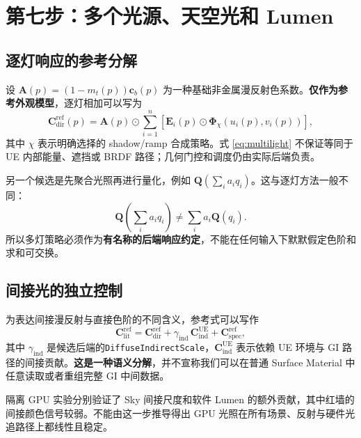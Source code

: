 \documentclass[UTF8,11pt,a4paper]{ctexart}
\newcommand{\Had}{\mathbin{\odot}}
\newcommand{\sref}{\mathrm{ref}}
\newcommand{\sue}{\mathrm{UE}}
\numberwithin{equation}{section}
\begin{document}
\section{第七步：多个光源、天空光和 Lumen}
\subsection{逐灯响应的参考分解}
设 $\mathbf A(p)=(1-m_t(p))\mathbf c_b(p)$ 为一种基础非金属漫反射色系数。\textbf{仅作为参考外观模型}，逐灯相加可以写为
\begin{equation}
\mathbf C_{\mathrm{dir}}^{\sref}(p)=
\mathbf A(p)\Had\sum_{i=1}^{n}
\left[\mathbf E_i(p)\Had \boldsymbol\Phi_\chi(u_i(p),v_i(p))\right],
\label{eq:multilight}
\end{equation}
其中 $\chi$ 表示明确选择的 shadow/ramp 合成策略。式 \eqref{eq:multilight} 不保证等同于 UE 内部能量、遮挡或 BRDF 路径；几何门控和调度仍由实际后端负责。

另一个候选是先聚合光照再进行量化，例如 $\mathbf Q(\sum_i a_iq_i)$。这与逐灯方法一般不同：
\begin{equation}
\mathbf Q\!\left(\sum_i a_iq_i\right)\ne
\sum_i a_i\mathbf Q(q_i).
\label{eq:nonlinear}
\end{equation}
所以多灯策略必须作为\textbf{有名称的后端响应约定}，不能在任何输入下默默假定色阶和求和可交换。

\subsection{间接光的独立控制}
为表达间接漫反射与直接色阶的不同含义，参考式可以写作
\begin{equation}
\mathbf C_{\mathrm{lit}}^{\sref}=
\mathbf C_{\mathrm{dir}}^{\sref}
+\gamma_{\mathrm{ind}}\,\mathbf C_{\mathrm{ind}}^{\sue}
+\mathbf C_{\mathrm{spec}}^{\sref},
\label{eq:indirect}
\end{equation}
其中 $\gamma_{\mathrm{ind}}$ 是候选后端的\texttt{DiffuseIndirectScale}，$\mathbf C_{\mathrm{ind}}^{\sue}$ 表示依赖 UE 环境与 GI 路径的间接贡献。\textbf{这是一种语义分解}，并不宣称我们可以在普通 Surface Material 中任意读取或者重组完整 GI 中间数据。

隔离 GPU 实验分别验证了 Sky 间接尺度和软件 Lumen 的额外贡献，其中红墙的间接颜色信号较弱。不能由这一步推导得出 GPU 光照在所有场景、反射与硬件光追路径上都线性且稳定。
\end{document}
